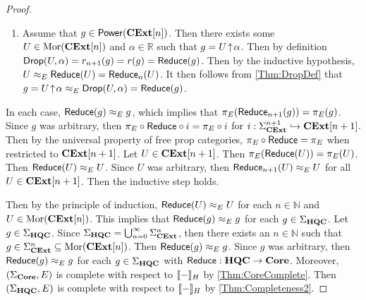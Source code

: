 \begin{proof}
\begin{itemize}
\begin{enumerate}
                By the inductive hypothesis, $U \approx_E \Reduce( U ) = \Reduce_n( U )$ for each $U \in \Mor( \CoreExt[n] )$.
                It then follows from \cref{Thm:ExpandDef} that $g \approx_E \Expand( g ) = \Reduce( g )$.
          \item Assume that $g \in \mathsf{Power}( \mathbf{CExt}[n] )$.
                Then there exists some $U \in \Mor( \CoreExt[n] )$ and $\alpha \in \mathbb{R}$ such that $g = U \!\uparrow\! \alpha$.
                Then by definition $\mathsf{Drop}( U, \alpha ) = r_{n+1}( g ) = r( g ) = \mathsf{Reduce}( g )$.
                Then by the inductive hypothesis, $U \approx_E \Reduce( U ) = \Reduce_n( U )$.
                It then follows from \cref{Thm:DropDef} that $g = U \!\uparrow\! \alpha \approx_E \mathsf{Drop}( U, \alpha ) = \mathsf{Reduce}( g )$.
          \end{enumerate}
          In each case, $\mathsf{Reduce}( g ) \approx_E g$, which implies that $\pi_E( \mathsf{Reduce}_{n+1}( g ) ) = \pi_E( g )$.
          Since $g$ was arbitrary, then $\pi_E \circ \mathsf{Reduce} \circ i = \pi_E \circ i$ for $i: \Sigma_{\mathbf{CExt}}^{n+1} \hookrightarrow \mathbf{CExt}[n+1]$.
          Then by the universal property of free prop categories, $\pi_E \circ \mathsf{Reduce} = \pi_E$ when restricted to $\mathbf{CExt}[n+1]$.
          Let $U \in \mathbf{CExt}[n+1]$.
          Then $\pi_E( \mathsf{Reduce}( U ) ) = \pi_E( U )$.
          Then $\mathsf{Reduce}( U ) \approx_E U$.
          Since $U$ was arbitrary, then $\mathsf{Reduce}_{n+1}( U ) \approx_E U$ for all $U \in \mathbf{CExt}[n+1]$.
          Then the inductive step holds.
    \end{itemize}
    Then by the principle of induction, $\mathsf{Reduce}( U ) \approx_E U$ for each $n \in \mathbb{N}$ and $U \in \Mor( \CoreExt[n] )$.
    This implies that $\mathsf{Reduce}( g ) \approx_E g$ for each $g \in \Sigma_{\mathbf{HQC}}$.
    Let $g \in \Sigma_{\mathbf{HQC}}$.
    Since $\Sigma_{\mathbf{HQC}} = \bigcup_{n=0}^\infty \Sigma_{\mathbf{CExt}}^n$, then there exists an $n \in \mathbb{N}$ such that $g \in \Sigma_{\mathbf{CExt}}^n \subseteq \operatorname{Mor}( \mathbf{CExt}[n] )$.
    Then $\mathsf{Reduce}( g ) \approx_E g$.
    Since $g$ was arbitrary, then $\mathsf{Reduce}( g ) \approx_E g$ for each $g \in \Sigma_{\mathbf{HQC}}$ with $\mathsf{Reduce}: \mathbf{HQC} \to \mathbf{Core}$.
    Moreover, $( \Sigma_{\mathbf{Core}}, E )$ is complete with respect to $\llbracket-\rrbracket_H$ by \cref{Thm:CoreComplete}.
    Then $( \Sigma_{\mathbf{HQC}}, E )$ is complete with respect to $\llbracket-\rrbracket_H$ by \cref{Thm:Completeness2}.
\end{proof}
